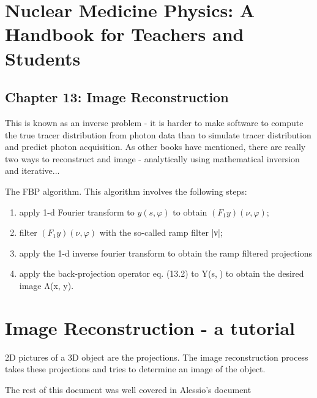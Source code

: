 \documentclass{article}
\begin{document}
\newpage
\section{Nuclear Medicine Physics: A Handbook for Teachers and Students \cite{Bailey2014}}

\subsection{Chapter 13: Image Reconstruction}
This is known as an inverse problem - it is harder to make software to compute the true tracer distribution from photon data than to simulate tracer distribution and predict photon acquisition. As other books have mentioned, there are really two ways to reconstruct and image - analytically using mathematical inversion and iterative...



The FBP algorithm. This algorithm involves the following steps:

\begin{enumerate}
\item apply 1-d Fourier transform to $y(s, φ)$ to obtain $(F_1y)(ν, φ)$;
\item filter $(F_1y)(ν, φ)$ with the so-called ramp filter |ν|;
\item apply the 1-d inverse fourier transform to obtain the ramp filtered projections
\item apply the back-projection operator eq. (13.2) to Y(s,) to obtain the desired image Λ(x, y).
\end{enumerate}









\newpage
\section{Image Reconstruction - a tutorial \cite{Zeng2001ImageTutorial}}

2D pictures of a 3D object are the projections. The image reconstruction process takes these projections and tries to determine an image of the object.  

The rest of this document was well covered in Alessio's document \cite{Alessio2006} 






\newpage

 

\end{document}

